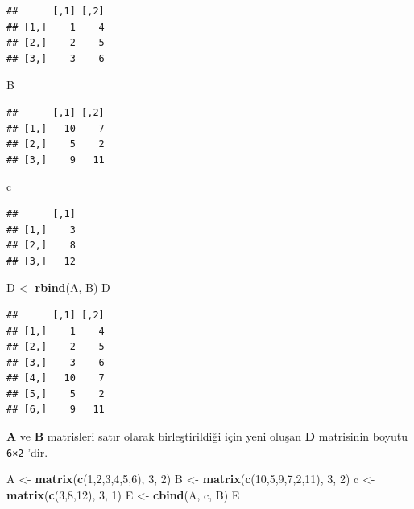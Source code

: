 \documentclass[
]{book}
\newenvironment{Shaded}{\begin{snugshade}}{\end{snugshade}}
\newcommand{\DecValTok}[1]{\textcolor[rgb]{0.00,0.00,0.81}{#1}}
\newcommand{\FunctionTok}[1]{\textcolor[rgb]{0.13,0.29,0.53}{\textbf{#1}}}
\newcommand{\NormalTok}[1]{#1}
\newcommand{\OtherTok}[1]{\textcolor[rgb]{0.56,0.35,0.01}{#1}}
\begin{document}
\begin{verbatim}
##      [,1] [,2]
## [1,]    1    4
## [2,]    2    5
## [3,]    3    6
\end{verbatim}

\begin{Shaded}
\begin{Highlighting}[]
\NormalTok{ B }
\end{Highlighting}
\end{Shaded}

\begin{verbatim}
##      [,1] [,2]
## [1,]   10    7
## [2,]    5    2
## [3,]    9   11
\end{verbatim}

\begin{Shaded}
\begin{Highlighting}[]
\NormalTok{ c }
\end{Highlighting}
\end{Shaded}

\begin{verbatim}
##      [,1]
## [1,]    3
## [2,]    8
## [3,]   12
\end{verbatim}

\begin{Shaded}
\begin{Highlighting}[]
\NormalTok{ D }\OtherTok{\textless{}{-}} \FunctionTok{rbind}\NormalTok{(A, B) }
\NormalTok{ D }
\end{Highlighting}
\end{Shaded}

\begin{verbatim}
##      [,1] [,2]
## [1,]    1    4
## [2,]    2    5
## [3,]    3    6
## [4,]   10    7
## [5,]    5    2
## [6,]    9   11
\end{verbatim}

\textbf{A} ve \textbf{B} matrisleri satır olarak birleştirildiği için yeni oluşan \textbf{D} matrisinin boyutu \texttt{6×2} 'dir.

\begin{Shaded}
\begin{Highlighting}[]
\NormalTok{ A }\OtherTok{\textless{}{-}} \FunctionTok{matrix}\NormalTok{(}\FunctionTok{c}\NormalTok{(}\DecValTok{1}\NormalTok{,}\DecValTok{2}\NormalTok{,}\DecValTok{3}\NormalTok{,}\DecValTok{4}\NormalTok{,}\DecValTok{5}\NormalTok{,}\DecValTok{6}\NormalTok{), }\DecValTok{3}\NormalTok{, }\DecValTok{2}\NormalTok{)}
\NormalTok{ B }\OtherTok{\textless{}{-}} \FunctionTok{matrix}\NormalTok{(}\FunctionTok{c}\NormalTok{(}\DecValTok{10}\NormalTok{,}\DecValTok{5}\NormalTok{,}\DecValTok{9}\NormalTok{,}\DecValTok{7}\NormalTok{,}\DecValTok{2}\NormalTok{,}\DecValTok{11}\NormalTok{), }\DecValTok{3}\NormalTok{, }\DecValTok{2}\NormalTok{) }
\NormalTok{ c }\OtherTok{\textless{}{-}} \FunctionTok{matrix}\NormalTok{(}\FunctionTok{c}\NormalTok{(}\DecValTok{3}\NormalTok{,}\DecValTok{8}\NormalTok{,}\DecValTok{12}\NormalTok{), }\DecValTok{3}\NormalTok{, }\DecValTok{1}\NormalTok{)}
\NormalTok{ E }\OtherTok{\textless{}{-}} \FunctionTok{cbind}\NormalTok{(A, c, B) }
\NormalTok{ E }
\end{Highlighting}
\end{Shaded}
\end{document}
